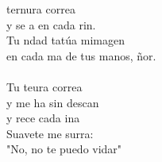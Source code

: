 \begin{cancion}[Tu ternura][Ixcís]%
	 ternura correa\\
	y se a en cada rin.\\
	Tu ndad tatúa mimagen\\
	en cada ma de tus manos, ñor.\\
\jump\\
	Tu teura correa\\
	y me ha sin descan\\
	y rece cada ina\\
	Suavete me surra:\\
	"No, no te puedo vidar"\\
\end{cancion}%

